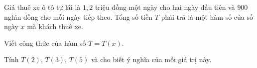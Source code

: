 \begin{bt}%
	Giá thuê xe ô tô tự lái là $ 1{,}2 $ triệu đồng một ngày cho hai ngày đầu tiên và $ 900 $ nghìn đồng cho mỗi ngày tiếp theo. Tổng số tiền $ T $ phải trả là một hàm số của số ngày $ x $ mà khách thuê xe.
	\begin{listEX}
		\item Viết công thức của hàm số $ T=T(x) $.
		\item Tính $ T(2) $, $ T(3) $, $ T(5) $ và cho biết ý nghĩa của mỗi giá trị này.
	\end{listEX}
\end{bt}

